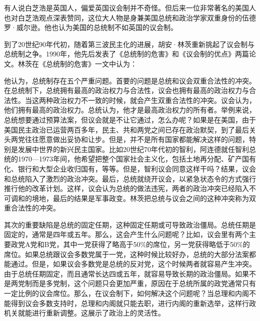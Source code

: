 有人说白芝浩是英国人，偏爱英国议会制并不奇怪。但后来一位非常著名的美国人也对白芝浩观点深表赞同，这位大人物是身兼美国总统和政治学家双重身份的伍德罗·威尔逊。他也认为美国的总统制不如英国的议会制。

到了20世纪90年代初，随着第三波民主化的进展，胡安·林茨重新挑起了议会制与总统制之争。1990年，他先后发表了《总统制的危害》和《议会制的优点》两篇论文。林茨在《总统制的危害》一文中认为：


他认为，总统制存在五个严重问题。首要的问题是总统和议会双重合法性的冲突。在总统制下，总统拥有最高的政治权力与合法性，议会也拥有最高的政治权力与合法性。当这两种政治权力不一致的时候，就会产生双重合法性的冲突。议会认为，他们拥有最高的政治权力。总统认为，他才是最高政治权力的所有者。举例来说，总统想要通过预算法案，但议会就是不让它通过，怎么办呢？如果是在美国，由于美国民主政治已运营两百多年，民主、共和两党之间已存在政治默契，到了最后关头两党往往愿意做出妥协和让步。但是，并不是所有国家都能解决这样的问题，特别是发展中世界的新兴民主国家。比如20世纪70年代初的智利，阿连德就任智利总统的1970—1973年间，他希望把整个国家社会主义化，包括土地再分配、矿产国有化、银行和大型企业收归国有，等等。但是，智利议会同意这样干吗？结果，议会和总统陷入了激烈的政治冲突。最后，总统就绕开议会，以紧急状态令的方式强行推行他的改革计划。这样，议会认为总统的做法违宪，两者的政治冲突已经陷入不可调和的境地，最后的结果是军事政变。林茨把总统与议会之间的这种冲突称为双重合法性的冲突。

其次的重要缺陷是总统的固定任期，这种固定任期或可导致政治僵局。总统任期是固定的，通常是四年或五年。那么，这会产生什么问题呢？比如，议会里有两个主要政党A党和B党，其中一党获得了略高于50\%的席位，另一党获得略低于50\%的席位。如果总统跟议会多数党属于一党，这种时候比较好办，总统的大部分法案都能通过。但是，如果议会多数党是总统的反对党，这个时候两者就容易产生冲突。由于总统任期固定，而且通常长达四或五年，就容易导致长期的政治僵局。如果不是两党制而是多党制，这个问题只会更加严重，原因在于总统所属的政党通常只有一定比例的议会席位。那么，在议会制下，如何解决这个问题呢？当总理和内阁不能得到议会多数支持时，总理和内阁就只能去职，进行内阁的重新选举，这样行政机关就能进行重新调整。这展示了政治上的灵活性。

